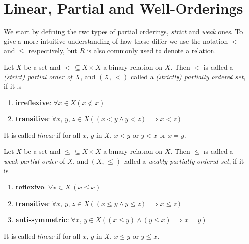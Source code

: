 \documentclass[../../main.tex]{subfiles}
\begin{document}
\section{Linear, Partial and Well-Orderings}

We start by defining the two types of partial orderings, \textit{strict} and \textit{weak} ones.
To give a more intuitive understanding of how these differ we use the notation $<$ and $\leq$ respectively, but $R$ is also commonly used to denote a relation.

\begin{definition}\cite[p.165]{Gol17}
    Let $X$ be a set and $<\, \subseteq X \times X$ a binary relation on $X$.
    Then $<$ is called a \textit{(strict) partial order of $X$}, and $(X,\, <)$ called a \textit{(strictly) partially ordered set}, if it is
    \begin{enumerate}[label=(\roman*)]
        \item \textbf{irreflexive}: $\forall x \in X \left(x \not < x\right)$
        \item \textbf{transitive}: $\forall x,\, y,\, z \in X \left(\left(x < y \wedge y < z\right) \implies x < z\right)$
    \end{enumerate}
    It is called \textit{linear} if for all $x$, $y$ in $X$, $x < y$ or $y < x$ or $x = y$.
\end{definition}

\begin{definition}\cite[p.164]{Gol17}
    Let $X$ be a set and $\leq\, \subseteq X \times X$ a binary relation on $X$.
    Then $\leq$ is called a \textit{weak partial order} of $X$, and $(X,\, \leq)$ called a \textit{weakly partially ordered set}, if it is
    \begin{enumerate}[label=(\roman*)]
        \item \textbf{reflexive}: $\forall x \in X \ (x \leq x)$
        \item \textbf{transitive}: $\forall x,\, y,\, z \in X \left(\left(x \leq y \wedge y \leq z\right) \implies x \leq z\right)$
        \item \textbf{anti-symmetric}: $\forall x,\, y \in X \left((x \leq y) \wedge (y \leq x) \implies x = y\right)$
    \end{enumerate} 
    It is called \textit{linear} if for all $x$, $y$ in $X$, $x \leq y$ or $y \leq x$.
\end{definition}
\end{document}
